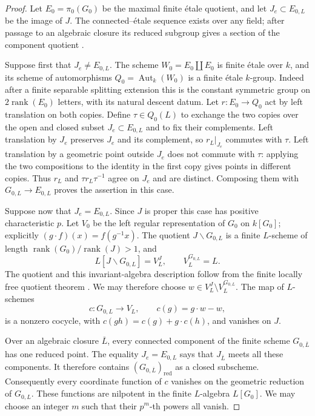 \begin{proof}
Let $E_0=\pi_0(G_0)$ be the maximal finite \'etale quotient, and let
$J_e\subset E_{0,L}$ be the image of $J$.  The connected--\'etale
sequence exists over any field; after passage to an algebraic closure
its reduced subgroup gives a section of the component quotient
\cite[Chapter~IV, Proposition~4.45]{C_MoonenQuotients}.

Suppose first that $J_e\ne E_{0,L}$.  The scheme
$W_0=E_0\amalg E_0$ is finite \'etale over $k$, and its scheme of
automorphisms $Q_0=\operatorname{Aut}_k(W_0)$ is a finite \'etale
$k$-group.  Indeed after a finite separable splitting extension this
is the constant symmetric group on $2\operatorname{rank}(E_0)$
letters, with its natural descent datum.  Let
$r\colon E_0\to Q_0$ act by left translation on both copies.
Define $\tau\in Q_0(L)$ to exchange the two copies over the open
and closed subset $J_e\subset E_{0,L}$ and to fix their complements.
Left translation by $J_e$ preserves $J_e$ and its complement, so
$r_L|_{J_e}$ commutes with $\tau$.  Left translation by a geometric
point outside $J_e$ does not commute with $\tau$: applying the two
compositions to the identity in the first copy gives points in
different copies.  Thus $r_L$ and $\tau r_L\tau^{-1}$ agree on
$J_e$ and are distinct.  Composing them with
$G_{0,L}\to E_{0,L}$ proves the assertion in this case.

Suppose now that $J_e=E_{0,L}$.  Since $J$ is proper this case has
positive characteristic $p$.  Let $V_0$ be the left regular
representation of $G_0$ on $k[G_0]$; explicitly
$(g\cdot f)(x)=f(g^{-1}x)$.  The quotient $J\backslash G_{0,L}$
is a finite $L$-scheme of length
$\operatorname{rank}(G_0)/\operatorname{rank}(J)>1$, and
\[
L[J\backslash G_{0,L}]=V_L^J,\qquad V_L^{G_{0,L}}=L.
\]
The quotient and this invariant-algebra description follow from the
finite locally free quotient theorem
\cite[Expos\'e~V, Theorem~4.1(iv)]{C_SGA3I}.
We may therefore choose $w\in V_L^J\setminus V_L^{G_{0,L}}$.
The map of $L$-schemes
\[
c\colon G_{0,L}\longrightarrow V_L,
\qquad c(g)=g\cdot w-w,
\]
is a nonzero cocycle, with
$c(gh)=c(g)+g\cdot c(h)$, and vanishes on $J$.

Over an algebraic closure $\overline L$, every connected component
of the finite scheme $G_{0,\overline L}$ has one reduced point.
The equality $J_e=E_{0,L}$ says that $J_{\overline L}$ meets all
these components.  It therefore contains
$(G_{0,\overline L})_{\mathrm{red}}$ as a closed subscheme.
Consequently every coordinate function of $c$ vanishes on the
geometric reduction of $G_{0,L}$.  These functions are nilpotent in
the finite $L$-algebra $L[G_0]$.  We may choose an integer $m$ such
that their $p^m$-th powers all vanish.


\end{proof}
